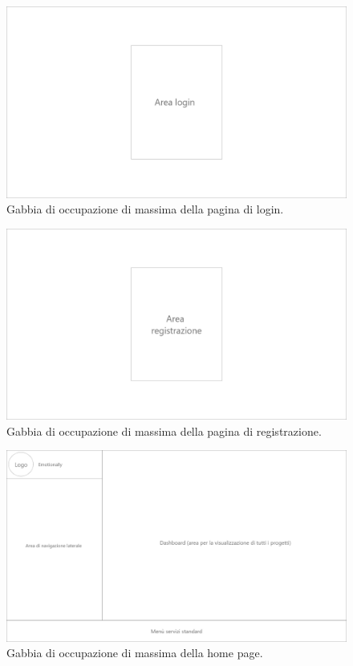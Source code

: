 \begin{figure}[H]
	\centering
	\caption{Gabbia di occupazione di massima della pagina di login.}
	\label{fig:gabbie-massima:login}
	\includegraphics[width=\textwidth]{images/gabbie-di-massima/Login}
\end{figure}
\begin{figure}[H]
	\centering

	\caption{Gabbia di occupazione di massima della pagina di registrazione.}
	\label{fig:gabbie-massima:registrazione}
	\includegraphics[width=\textwidth]{images/gabbie-di-massima/Registrazione}
\end{figure}

\begin{figure}[H]
	\centering
	\caption{Gabbia di occupazione di massima della home page.}
	\label{fig:gabbie-massima:home-page}
	\includegraphics[width=\textwidth]{images/gabbie-di-massima/Home}
\end{figure}

